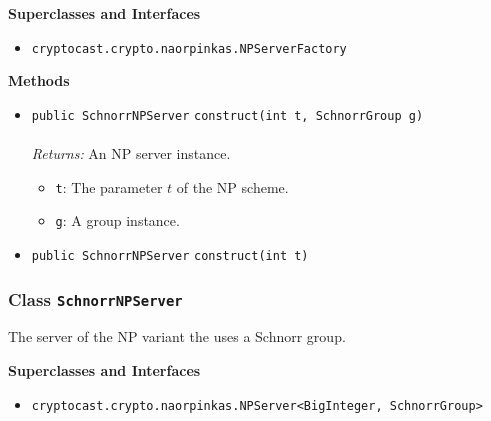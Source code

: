 \textbf{\sffamily Superclasses and Interfaces}
\begin{itemize}
\item \lstinline|cryptocast.crypto.naorpinkas.NPServerFactory|
\end{itemize}



\textbf{\sffamily Methods}
\begin{itemize}
\item \lstinline|public SchnorrNPServer| \lstinline|construct|\lstinline|(int t, SchnorrGroup g)|\\ \\[-0.6em]
\emph{Returns:} An NP server instance.
\begin{itemize}
\item \lstinline|t|: The parameter $t$ of the NP scheme.
\item \lstinline|g|: A group instance.
\end{itemize}



\item \lstinline|public SchnorrNPServer| \lstinline|construct|\lstinline|(int t)| \\[-0.6em]




\end{itemize}

\subsubsection{Class \lstinline|SchnorrNPServer|}
The server of the NP variant the uses a Schnorr group. \\
\noindent\begin{minipage}[t]{5cm}
\vspace{0.3em}
\hspace*{2em}
\vspace{0.3em}
\end{minipage}



\textbf{\sffamily Superclasses and Interfaces}
\begin{itemize}
\item \lstinline|cryptocast.crypto.naorpinkas.NPServer<BigInteger, SchnorrGroup>|
\end{itemize}



